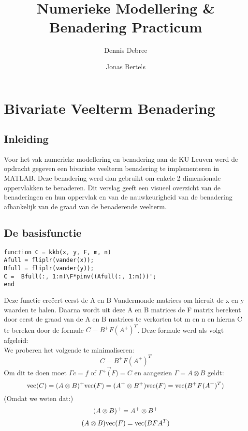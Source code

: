 \documentclass[a4paper]{article}
\title{Numerieke Modellering \& Benadering Practicum}
\author{Dennis Debree}
\author{Jonas Bertels}
\affil{KU Leuven Departement Computerwetenschappen}
\begin{document}
\maketitle
\section{Bivariate Veelterm Benadering}
\subsection{Inleiding}
Voor het vak numerieke modellering en benadering aan de KU Leuven werd de opdracht gegeven een bivariate veelterm benadering te implementeren in MATLAB. Deze benadering werd dan gebruikt om enkele 2 dimensionale oppervlakken te benaderen. Dit verslag geeft een visueel overzicht van de benaderingen en hun oppervlak en van de nauwkeurigheid van de benadering afhankelijk van de graad van de benaderende veelterm.
\subsection{De basisfunctie}
\begin{verbatim}
function C = kkb(x, y, F, m, n)
Afull = fliplr(vander(x));
Bfull = fliplr(vander(y));
C =  Bfull(:, 1:n)\F*pinv((Afull(:, 1:m)))';
end
\end{verbatim}
Deze functie creëert eerst de A en B Vandermonde matrices om hieruit de x en y waarden te halen. Daarna wordt uit deze A en B matrices de F matrix berekent door eerst de graad van de A en B matrices te verkorten tot m en n en hierna C te bereken door de formule $C = B^{+}F(A^{+})^{T}$. Deze formule werd als volgt afgeleid:\\
We proberen het volgende te minimaliseren:
\begin{equation}
C = B^{+}F(A^{+})^{T} \label{solution}
\end{equation}
Om dit te doen moet $\Gamma c = f$ of $\Gamma^{+} \vec(F) = C$ en aangezien $\Gamma = A\otimes B$ geldt:
\begin{equation}
\text{vec}(C) = (A\otimes B)^{+}\text{vec}(F) = (A^{+}\otimes B^{+})\text{vec}(F) = \text{vec}(B^{+}F(A^{+})^{T})   \label{singleInverse}\\
\end{equation}
(Omdat we weten dat:)
\begin{equation}
(A\otimes B)^{+} = A^{+} \otimes B^{+} \label{distribution}\\
\end{equation}
\begin{equation}
(A\otimes B)\text{vec}(F) = \text{vec}(BFA^{T}) \label{transformation}\\
\end{equation}
\end{document}
